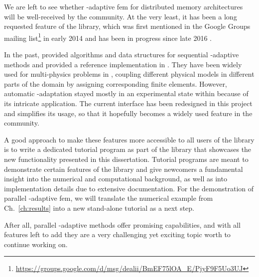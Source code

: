 
We are left to see whether \hp-adaptive \gls{fem} for distributed memory architectures will be well-received by the community. At the very least, it has been a long requested feature of the \dealii{} library, which was first mentioned in the Google Groups\texttrademark \dealii{} mailing list\footnote{\url{https://groups.google.com/d/msg/dealii/BmEF75lOA_E/PjyF9F5Uo3UJ}} in early 2014 and has been in progress since late 2016 \textcite{dealiiissue3511}.

In the past, \textcite{bangerth2009} provided algorithms and data structures for sequential \hp-adaptive methods and provided a reference implementation in \dealii{}. They have been widely used for multi-physics problems in \dealii{}, coupling different physical models in different parts of the domain by assigning corresponding finite elements. However, automatic \hp-adaptation stayed mostly in an experimental state within \dealii{} because of its intricate application. The current interface has been redesigned in this project and simplifies its usage, so that it hopefully becomes a widely used feature in the community.

A good approach to make these features more accessible to all users of the library is to write a dedicated tutorial program as part of the \dealii{} library that showcases the new functionality presented in this dissertation. Tutorial programs are meant to demonstrate certain features of the library and give newcomers a fundamental insight into the numerical and computational background, as well as into implementation details due to extensive documentation.
For the demonstration of parallel \hp-adaptive \gls{fem}, we will translate the numerical example from Ch.~\ref{ch:results} into a new stand-alone tutorial as a next step.






After all, parallel \hp-adaptive methods offer promising capabilities, and with all features left to add they are a very challenging yet exciting topic worth to continue working on.

